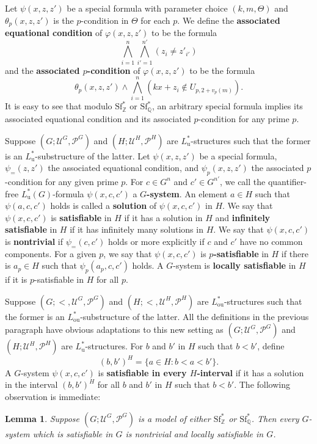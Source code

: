 \documentclass[letterpaper]{amsart}
\newcommand{\qq}{\mathbb{Q}}
\newcommand{\zz}{\mathbb{Z}}
\newcommand{\sU}{\mathscr{U}}
\newcommand{\sP}{\mathscr{P}}
\newcommand{\WSFZ}{\mathrm{Sf}^*_{\zz}}
\newcommand{\WSFQ}{\mathrm{Sf}^*_{\qq}}
\newtheorem{lem}[thm]{Lemma}
\begin{document}
\medskip \noindent Let $\psi(x, z, z')$ be a special formula with parameter choice  $(k,m,\Theta)$ and $\theta_p(x, z, z')$ is the $p$-condition in $\Theta$ for each $p$. We define the {\bf associated equational condition} of  $\varphi(x, z, z' )$  to be the formula  
$$ \bigwedge_{i =1}^n  \bigwedge_{i'=1}^{n'} (z_i\neq z'_{i'})$$ 
and the {\bf associated $p$-condition} of  $\varphi(x, z, z' )$ to be the formula
$$ \theta_p(x, z , z') \wedge \bigwedge_{i=1}^n (kx+z_i\notin U_{p, 2+v_p(m)}). $$
It is easy to see that modulo $\WSFZ$ or $\WSFQ$, an arbitrary special formula implies its associated equational condition and its associated $p$-condition for any prime $p$.

\medskip \noindent  Suppose $(G; \sU^G, \sP^G)$ and $(H; \sU^H, \sP^H)$ are $L_\mathrm{u}^*$-structures such that the former is an $L_\mathrm{u}^*$-substructure of the latter. Let $\psi(x, z, z')$ be a special formula, $\psi_{=}(z,z')$  the associated equational condition, and $\psi_{p}(x,z,z')$ the associated $p$-condition for any given prime $p$.  For $c \in G^n$ and $c' \in G^{n'}$, we call the quantifier-free $L_\mathrm{u}^*(G)$-formula $\psi(x, c, c')$  a {\bf $G$-system}.  An element $a\in H$ such that $\psi(a, c, c')$ holds is called a {\bf solution} of $\psi(x, c, c')$ in $H$.
We say that $\psi(x, c, c')$ is {\bf satisfiable} in $H$ if it has a solution in $H$ and {\bf infinitely satisfiable} in $H$ if it has infinitely many solutions in $H$. 
 We say that $\psi(x, c, c')$ is {\bf nontrivial} if $ \psi_=(c, c')$ holds or more explicitly if $c$ and $c'$ have no common components.
For a given $p$, we say that $\psi(x, c, c')$ is {\bf $p$-satisfiable} in $H$ if there is $a_p\in H$  such that  $\psi_p(a_p, c, c')$ holds. A $G$-system  is {\bf locally satisfiable} in $H$ if it is  $p$-satisfiable in $H$ for all $p$.   


\medskip \noindent  Suppose $(G; <, \sU^G, \sP^G)$ and $(H; <, \sU^H, \sP^H)$ are $L_\mathrm{ou}^*$-structures such that the former is an $L_\mathrm{ou}^*$-substructure of the latter.  All the definitions in the previous paragraph have obvious adaptations to this new setting as $(G; \sU^G, \sP^G)$ and  $(H;\sU^H, \sP^H)$ are $L_\mathrm{u}^*$-structures.
For $b$ and $b'$ in $H$ such that $b<b'$, define 
$$(b, b')^H = \{ a \in H: b<a<b'\}.$$ 
A $G$-system $\psi(x, c, c')$ is {\bf satisfiable in every $H$-interval} if it has a solution in the interval $(b, b')^H$ for all $b$ and $b'$ in $H$ such that $b<b'$. The following observation is immediate:

\begin{lem}\label{GlobaltoLocal}
Suppose $(G; \sU^G, \sP^G)$ is a model of either $\WSFZ$ or $\WSFQ$. Then every $G$-system which is satisfiable in $G$ is nontrivial and locally satisfiable in $G$. 
\end{lem}
\end{document}
